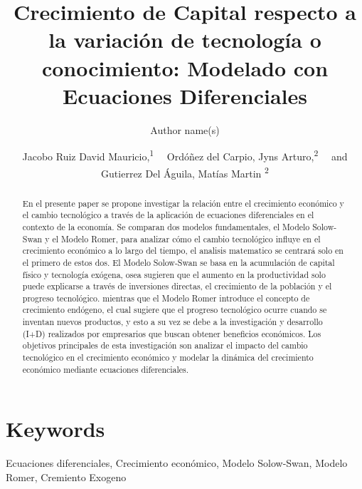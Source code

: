 \documentclass[letterpaper, 10pt]{article}
\newcommand\authormark[1]{\textsuperscript{#1}}
\begin{document}
\title{Crecimiento de Capital respecto a la variación de tecnología o conocimiento: Modelado con Ecuaciones Diferenciales}

\author{Author name(s)}



\author{Jacobo Ruiz David Mauricio,\authormark{1} ~~Ordóñez del Carpio, Jyns Arturo,\authormark{2} ~~and Gutierrez Del Águila, Matías Martin \authormark{2} }

\address{\authormark{1} \href{david.jacobo@utec.edu.pe}{david.jacobo@utec.edu.pe} ~~~~202220396\\
\authormark{2} \\
\authormark{3}
}

\email{\authormark{*}opex@optica.org} %


\begin{abstract}
En el presente paper se propone investigar la relación entre el crecimiento económico y el cambio tecnológico a
través de la aplicación de ecuaciones diferenciales en el contexto de la economía. Se comparan dos modelos 
fundamentales, el Modelo Solow-Swan y el Modelo Romer, para analizar cómo el cambio tecnológico influye 
en el crecimiento económico a lo largo del tiempo, el analisis matematico se centrará solo en el primero de estos
dos. 
El Modelo Solow-Swan se basa en la acumulación de capital físico y tecnología exógena, osea sugieren que 
el aumento en la productividad solo puede explicarse a través de inversiones directas, 
el crecimiento de la población y el progreso tecnológico.\cite{Chirwa18}
mientras que el Modelo Romer introduce el concepto de crecimiento endógeno, el cual sugiere que el progreso tecnológico 
ocurre cuando se inventan nuevos productos, y esto a su vez se debe a la investigación y desarrollo (I+D) realizados por empresarios que buscan obtener beneficios 
económicos\cite{Chu18}. Los objetivos principales de esta investigación son analizar el impacto del cambio tecnológico en el crecimiento económico y modelar la dinámica del crecimiento económico mediante ecuaciones diferenciales.
\end{abstract}

\section*{Keywords}
\begin{flushright}
    Ecuaciones diferenciales, Crecimiento económico, Modelo Solow-Swan, Modelo Romer, Cremiento Exogeno
\end{flushright}
\end{document}
